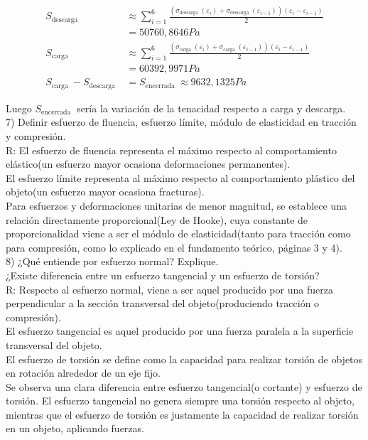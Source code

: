 \documentclass[10pt]{article}
\begin{document}
$$
\begin{aligned}
S_{\text {descarga }} & \approx \sum_{i=1}^{6} \frac{\left(\sigma_{\text {descarga }}\left(\varepsilon_{i}\right)+\sigma_{\text {descarga }}\left(\varepsilon_{i-1}\right)\right)\left(\varepsilon_{i}-\varepsilon_{i-1}\right)}{2} \\
& =50760,8646 P a \\
S_{\text {carga }} & \approx \sum_{i=1}^{6} \frac{\left(\sigma_{\text {carga }}\left(\varepsilon_{i}\right)+\sigma_{\text {carga }}\left(\varepsilon_{i-1}\right)\right)\left(\varepsilon_{i}-\varepsilon_{i-1}\right)}{2} \\
& =60392,9971 P a \\
S_{\text {carga }}-S_{\text {descarga }} & =S_{\text {encerrada }} \approx 9632,1325 P a
\end{aligned}
$$

Luego $S_{\text {encerrada }}$ sería la variación de la tenacidad respecto a carga y descarga.\\
7) Definir esfuerzo de fluencia, esfuerzo límite, módulo de elasticidad en tracción y compresión.\\
R: El esfuerzo de fluencia representa el máximo respecto al comportamiento elástico(un esfuerzo mayor ocasiona deformaciones permanentes).\\
El esfuerzo límite representa al máximo respecto al comportamiento plástico del objeto(un esfuerzo mayor ocasiona fracturas).\\
Para esfuerzos y deformaciones unitarias de menor magnitud, se establece una relación directamente proporcional(Ley de Hooke), cuya constante de proporcionalidad viene a ser el módulo de elasticidad(tanto para tracción como para compresión, como lo explicado en el fundamento teórico, páginas 3 y 4).\\
8) ¿Qué entiende por esfuerzo normal? Explique.\\
¿Existe diferencia entre un esfuerzo tangencial y un esfuerzo de torsión?\\
R: Respecto al esfuerzo normal, viene a ser aquel producido por una fuerza perpendicular a la sección transversal del objeto(produciendo tracción o compresión).\\
El esfuerzo tangencial es aquel producido por una fuerza paralela a la superficie transversal del objeto.\\
El esfuerzo de torsión se define como la capacidad para realizar torsión de objetos en rotación alrededor de un eje fijo.\\
Se observa una clara diferencia entre esfuerzo tangencial(o cortante) y esfuerzo de torsión. El esfuerzo tangencial no genera siempre una torsión respecto al objeto, mientras que el esfuerzo de torsión es justamente la capacidad de realizar torsión en un objeto, aplicando fuerzas.
\end{document}
